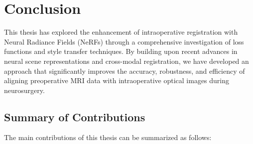 
\chapter{Conclusion}\label{chapter:conclusion}

This thesis has explored the enhancement of intraoperative registration with Neural Radiance Fields (NeRFs) through a comprehensive investigation of loss functions and style transfer techniques. By building upon recent advances in neural scene representations and cross-modal registration, we have developed an approach that significantly improves the accuracy, robustness, and efficiency of aligning preoperative MRI data with intraoperative optical images during neurosurgery.

\section{Summary of Contributions}

The main contributions of this thesis can be summarized as follows:

